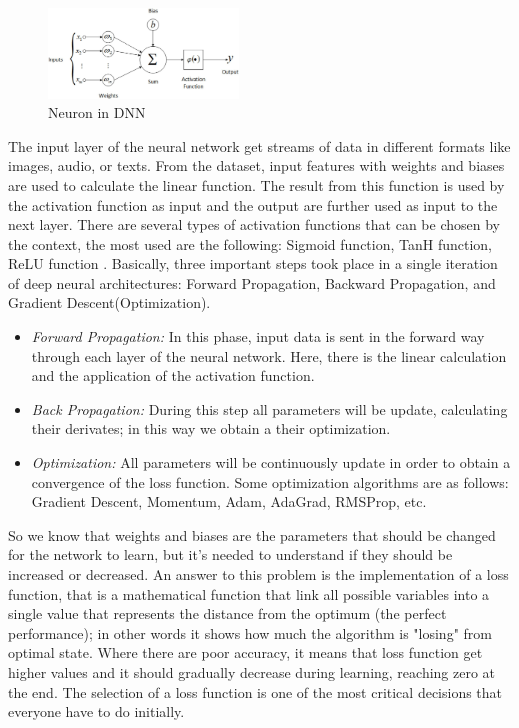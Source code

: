 \documentclass[english, LaM, oneside]{sapthesis}%
\begin{document}
\begin{figure}[!h]
            \centering
            \includegraphics[width=0.45\textwidth]{MLP}
            \caption{Neuron in DNN}
            \label{fig:mlp}
        \end{figure}
  \newline \newline  
The input layer of the neural network get streams of data in different formats like images, audio, or texts. From the dataset, input features with weights and biases are used to calculate the linear function. The result from this function is used by the activation function as input and the output are further used as input to the next layer.
There are several types of activation functions that can be chosen by the context, the most used are the following: Sigmoid function, TanH function, ReLU function \cite{act_function}.
\newline \newline
Basically, three important steps took place in a single iteration of deep neural architectures: Forward Propagation, Backward Propagation, and Gradient Descent(Optimization).
\begin{itemize}
\item \textit{Forward Propagation:} In this phase, input data is sent in the forward way through each layer of the neural network. Here, there is the linear calculation and the application of the activation function.
\item \textit{Back Propagation:} During this step all parameters will be update, calculating their derivates; in this way we obtain a their optimization.
\item \textit{Optimization: }All parameters will be continuously update in order to obtain a convergence of the loss function. Some optimization algorithms are as follows: Gradient Descent, Momentum, Adam, AdaGrad, RMSProp, etc.
\end{itemize}
So we know that  weights and biases are the parameters that should be changed for the network to learn, but it's needed to understand if they should be increased or decreased. An answer to this problem is the implementation of a loss function, that is a mathematical function that link all possible variables into a single value that represents the distance from the optimum (the perfect performance); in other words it shows how much the algorithm is "losing" from optimal state. Where there are poor accuracy, it means that loss function get higher values and it should gradually decrease during learning, reaching zero at the end. The selection of a loss function is one of the most critical decisions that everyone have to do initially.
\end{document}
